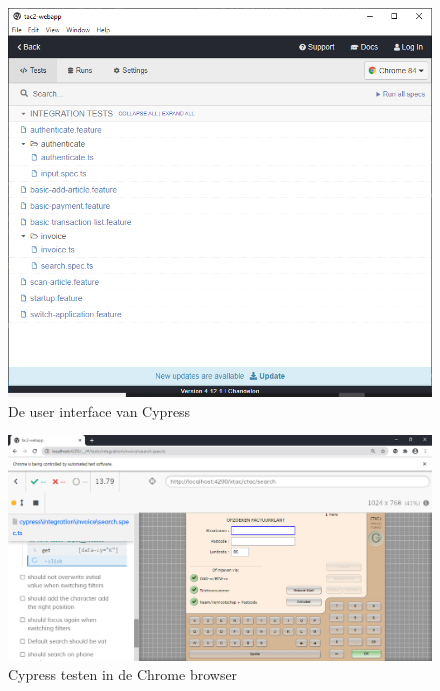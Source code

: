 \begin{figure}[h!]
    \centering
    \includegraphics[scale=0.35]{img/corpus/Cypress-UI.PNG}
    \caption{De user interface van Cypress}
    \label{fig:CypressUI}
\end{figure}

\begin{figure}[h!]
    \centering
    \includegraphics[scale=0.35]{img/corpus/Cypress-Running-Test.PNG}
    \caption{Cypress testen in de Chrome browser}
    \label{fig:CypressRunning}
\end{figure}


